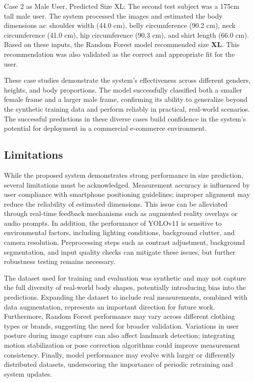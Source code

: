 \documentclass{llncs}
\begin{document}
\hspace*{2em} Case 2 as Male User, Predicted Size XL:
The second test subject was a 175cm tall male user. The system processed the images and estimated the body dimensions as: shoulder width (44.0 cm), belly circumference (90.2 cm), neck circumference (41.0 cm), hip circumference (90.3 cm), and shirt length (66.0 cm). Based on these inputs, the Random Forest model recommended size \textbf{XL}. This recommendation was also validated as the correct and appropriate fit for the user.


These case studies demonstrate the system's effectiveness across different genders, heights, and body proportions. The model successfully classified both a smaller female frame and a larger male frame, confirming its ability to generalize beyond the synthetic training data and perform reliably in practical, real-world scenarios. The successful predictions in these diverse cases build confidence in the system's potential for deployment in a commercial e-commerce environment.

\subsection{Limitations}
While the proposed system demonstrates strong performance in size prediction, several limitations must be acknowledged.
Measurement accuracy is influenced by user compliance with smartphone positioning guidelines; improper alignment may reduce the reliability of estimated dimensions. 
This issue can be alleviated through real-time feedback mechanisms such as augmented reality overlays or audio prompts. 
In addition, the performance of YOLOv11 is sensitive to environmental factors, including lighting conditions, background clutter, and camera resolution. 
Preprocessing steps such as contrast adjustment, background segmentation, and input quality checks can mitigate these issues, but further robustness testing remains necessary.

The dataset used for training and evaluation was synthetic and may not capture the full diversity of real-world body shapes, potentially introducing bias into the predictions. 
Expanding the dataset to include real measurements, combined with data augmentation, represents an important direction for future work. 
Furthermore, Random Forest performance may vary across different clothing types or brands, suggesting the need for broader validation. 
Variations in user posture during image capture can also affect landmark detection; integrating motion stabilization or pose correction algorithms could improve measurement consistency. 
Finally, model performance may evolve with larger or differently distributed datasets, underscoring the importance of periodic retraining and system updates.
\end{document}
